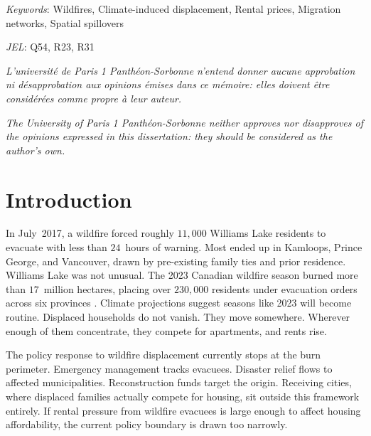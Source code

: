 \documentclass[12pt]{article}
\begin{document}
\begin{singlespace}
\smallskip
\noindent\textit{Keywords}: Wildfires, Climate-induced displacement, Rental prices, Migration networks, Spatial spillovers

\smallskip
\noindent\textit{JEL}: Q54, R23, R31
\end{singlespace}

\newpage

\begin{center}
\bigskip\vspace*{6in}

\textit{L'universit\'{e} de Paris 1 Panth\'{e}on-Sorbonne n'entend donner aucune approbation
ni d\'{e}sapprobation aux opinions \'{e}mises dans ce m\'{e}moire: elles doivent \^{e}tre consid\'{e}r\'{e}es comme propre \`{a} leur auteur.}

\bigskip\vspace*{0.25in}

\textit{The University of Paris 1 Panth\'{e}on-Sorbonne neither approves nor
disapproves of the opinions expressed in this dissertation: they should be
considered as the author's own.}
\end{center}

\newpage
\begingroup
{}
\tableofcontents
\endgroup
\newpage

\section{Introduction}
\label{sec:intro}

In July~2017, a wildfire forced roughly $11{,}000$ Williams Lake residents to evacuate
with less than $24$~hours of warning. Most ended up in Kamloops, Prince George, and Vancouver, drawn by pre-existing
family ties and prior residence. Williams Lake was not unusual. The 2023 Canadian wildfire season burned more than $17$~million hectares,
placing over $230{,}000$ residents under evacuation orders across six provinces
\citep{ciffc2024, publicsafetycanada2024}. Climate projections suggest seasons like 2023
will become routine. Displaced households do not vanish. They move somewhere. Wherever
enough of them concentrate, they compete for apartments, and rents rise.

The policy response to wildfire displacement currently stops at the burn perimeter.
Emergency management tracks evacuees. Disaster relief flows to affected municipalities.
Reconstruction funds target the origin. Receiving cities, where displaced families
actually compete for housing, sit outside this framework entirely. If rental pressure
from wildfire evacuees is large enough to affect housing affordability, the current
policy boundary is drawn too narrowly.
\end{document}
